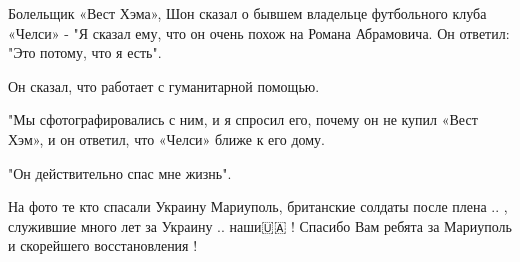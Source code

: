 Болельщик «Вест Хэма», Шон сказал о бывшем владельце футбольного клуба «Челси» - "Я сказал ему, что он очень похож на Романа Абрамовича. Он ответил: "Это потому, что я есть".

Он сказал, что работает с гуманитарной помощью.

"Мы сфотографировались с ним, и я спросил его, почему он не купил «Вест Хэм», и он ответил, что «Челси» ближе к его дому.

"Он действительно спас мне жизнь".

На фото те кто спасали Украину Мариуполь, британские солдаты после плена .. ,
служившие много лет за Украину .. наши🇺🇦 !  Спасибо Вам ребята за Мариуполь и
скорейшего восстановления !🙏🙏🙏
